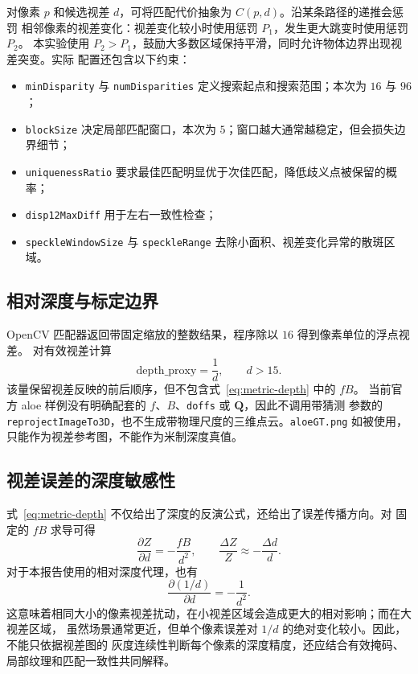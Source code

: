 对像素 $p$ 和候选视差 $d$，可将匹配代价抽象为 $C(p,d)$。沿某条路径的递推会惩罚
相邻像素的视差变化：视差变化较小时使用惩罚 $P_1$，发生更大跳变时使用惩罚 $P_2$。
本实验使用 $P_2>P_1$，鼓励大多数区域保持平滑，同时允许物体边界出现视差突变。实际
配置还包含以下约束：

\begin{itemize}
  \item \texttt{minDisparity} 与 \texttt{numDisparities} 定义搜索起点和搜索范围；本次为 $16$ 与 $96$；
  \item \texttt{blockSize} 决定局部匹配窗口，本次为 $5$；窗口越大通常越稳定，但会损失边界细节；
  \item \texttt{uniquenessRatio} 要求最佳匹配明显优于次佳匹配，降低歧义点被保留的概率；
  \item \texttt{disp12MaxDiff} 用于左右一致性检查；
  \item \texttt{speckleWindowSize} 与 \texttt{speckleRange} 去除小面积、视差变化异常的散斑区域。
\end{itemize}

\subsection{相对深度与标定边界}

OpenCV 匹配器返回带固定缩放的整数结果，程序除以 $16$ 得到像素单位的浮点视差。
对有效视差计算
\begin{equation}
  \mathrm{depth\_proxy}=\frac{1}{d},\qquad d>15.
  \label{eq:proxy-depth}
\end{equation}
该量保留视差反映的前后顺序，但不包含式~\eqref{eq:metric-depth} 中的 $fB$。
当前官方 aloe 样例没有明确配套的 $f$、$B$、\texttt{doffs} 或 $\mathbf{Q}$，因此不调用带猜测
参数的 \texttt{reprojectImageTo3D}，也不生成带物理尺度的三维点云。\texttt{aloeGT.png} 如被使用，
只能作为视差参考图，不能作为米制深度真值。

\subsection{视差误差的深度敏感性}

式~\eqref{eq:metric-depth} 不仅给出了深度的反演公式，还给出了误差传播方向。对
固定的 $fB$ 求导可得
\begin{equation}
  \frac{\partial Z}{\partial d}=-\frac{fB}{d^2},\qquad
  \frac{\Delta Z}{Z}\approx-\frac{\Delta d}{d}.
  \label{eq:depth-sensitivity}
\end{equation}
对于本报告使用的相对深度代理，也有
\begin{equation}
  \frac{\partial (1/d)}{\partial d}=-\frac{1}{d^2}.
\end{equation}
这意味着相同大小的像素视差扰动，在小视差区域会造成更大的相对影响；而在大视差区域，
虽然场景通常更近，但单个像素误差对 $1/d$ 的绝对变化较小。因此，不能只依据视差图的
灰度连续性判断每个像素的深度精度，还应结合有效掩码、局部纹理和匹配一致性共同解释。

